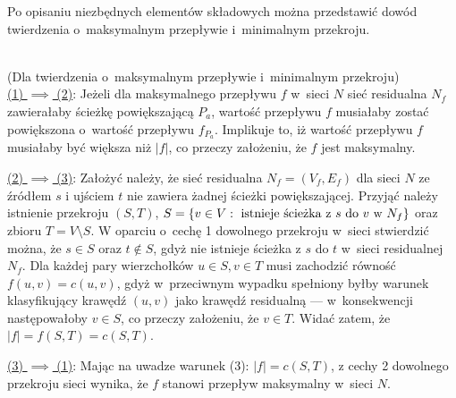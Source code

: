 \par{
  Po opisaniu niezbędnych elementów składowych można przedstawić dowód twierdzenia o~maksymalnym przepływie i~minimalnym przekroju.
\\
\\
  \begin{bproof}{(Dla twierdzenia o~maksymalnym przepływie i~minimalnym przekroju)\\}
    \underline{(1) $\implies$ (2)}: Jeżeli dla maksymalnego przepływu $f$ w~sieci $N$ sieć residualna $N_f$ zawierałaby ścieżkę powiększającą $P_a$, wartość przepływu $f$ musiałaby zostać powiększona o~wartość przepływu $f_{P_a}$.
    Implikuje to, iż wartość przepływu $f$ musiałaby być większa niż $|f|$, co przeczy założeniu, że $f$ jest maksymalny.

    \underline{(2) $\implies$ (3)}: Założyć należy, że sieć residualna $N_f=(V_f, E_f)$ dla sieci $N$ ze źródłem $s$ i ujściem $t$ nie zawiera żadnej ścieżki powiększającej.
    Przyjąć należy istnienie przekroju $(S, T)$, $S=\{v \in V:\textnormal{ istnieje ścieżka z }s\textnormal{ do }v\textnormal{ w~}N_f\}$ oraz zbioru $T=V\setminus S$.
    W oparciu o~cechę 1 dowolnego przekroju w~sieci stwierdzić można, że $s \in S$ oraz $t \notin S$, gdyż nie istnieje ścieżka z $s$ do $t$ w~sieci residualnej $N_f$.
    Dla każdej pary wierzchołków $u \in S, v \in T$ musi zachodzić równość $f(u, v)=c(u, v)$, gdyż w~przeciwnym wypadku spełniony byłby warunek klasyfikujący krawędź $(u,v)$ jako krawędź residualną --- w~konsekwencji następowałoby $v \in S$, co przeczy założeniu, że $v \in T$.
    Widać zatem, że $|f|=f(S, T)=c(S, T)$.

    \underline{(3) $\implies$ (1)}: Mając na uwadze warunek (3): $|f|=c(S,T)$, z cechy 2 dowolnego przekroju sieci wynika, że $f$ stanowi przepływ maksymalny w~sieci $N$.
  \end{bproof}
}
